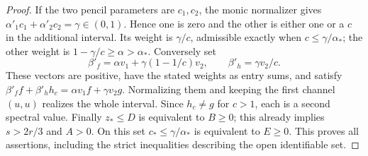 \begin{proof}
If the two pencil parameters are $c_1,c_2$, the monic normalizer gives
$\alpha'_1c_1+\alpha'_2c_2=\gamma\in(0,1)$. Hence one is zero and
the other is either one or a $c$ in the additional interval. Its
weight is $\gamma/c$, admissible exactly when $c\le\gamma/\alpha_*$;
the other weight is $1-\gamma/c\ge\alpha>\alpha_*$. Conversely set
\[
 \beta'_f=\alpha v_1+\gamma(1-1/c)v_2,\qquad
 \beta'_h=\gamma v_2/c.
\]
These vectors are positive, have the stated weights as entry sums,
and satisfy $\beta'_ff+\beta'_hh_c=\alpha v_1f+\gamma v_2g$.
Normalizing them and keeping the first channel $(u,u)$ realizes the
whole interval. Since $h_c\ne g$ for $c>1$, each is a second spectral
value. Finally $z_*\le D$ is equivalent to $B\ge0$; this already
implies $s>2r/3$ and $A>0$. On this set $c_*\le\gamma/\alpha_*$
is equivalent to $E\ge0$. This proves all assertions, including the
strict inequalities describing the open identifiable set.
\end{proof}

